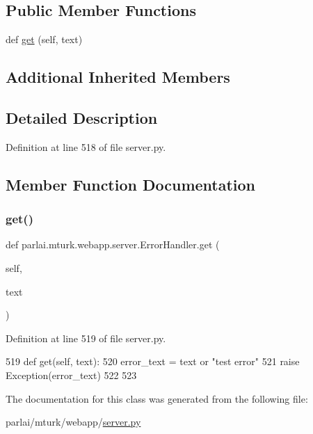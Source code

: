 \subsection*{Public Member Functions}
\begin{DoxyCompactItemize}
\item 
def \hyperlink{classparlai_1_1mturk_1_1webapp_1_1server_1_1ErrorHandler_ac3b2ba04b0b32eb33f67f7637508a4d6}{get} (self, text)
\end{DoxyCompactItemize}
\subsection*{Additional Inherited Members}


\subsection{Detailed Description}


Definition at line 518 of file server.\+py.



\subsection{Member Function Documentation}
\mbox{\label{classparlai_1_1mturk_1_1webapp_1_1server_1_1ErrorHandler_ac3b2ba04b0b32eb33f67f7637508a4d6}} 
\subsubsection{\texorpdfstring{get()}{get()}}
{\footnotesize\ttfamily def parlai.\+mturk.\+webapp.\+server.\+Error\+Handler.\+get (\begin{DoxyParamCaption}\item[{}]{self,  }\item[{}]{text }\end{DoxyParamCaption})}



Definition at line 519 of file server.\+py.


\begin{DoxyCode}
519     \textcolor{keyword}{def }get(self, text):
520         error\_text = text \textcolor{keywordflow}{or} \textcolor{stringliteral}{"test error"}
521         \textcolor{keywordflow}{raise} Exception(error\_text)
522 
523 
\end{DoxyCode}


The documentation for this class was generated from the following file\+:\begin{DoxyCompactItemize}
\item 
parlai/mturk/webapp/\hyperlink{server_8py}{server.\+py}\end{DoxyCompactItemize}

